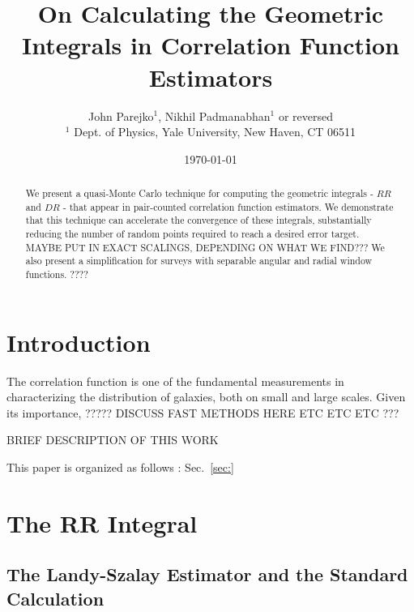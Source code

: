 \documentclass[usenatbib]{mn2e}
\begin{document}
\topmargin-1cm

\newcommand{\bd}{{\bm \delta}}


\title[Geometric Integrals for Correlation Functions]
{On Calculating the Geometric Integrals in Correlation Function Estimators}
\author[Parejko\&Padmanabhan]{John Parejko$^{1}$, Nikhil Padmanabhan$^{1}$ or
reversed \\
$^{1}$ Dept. of Physics, Yale University, New Haven, CT 06511 \\
}

\date{\today}
\maketitle

\begin{abstract}
  We present a quasi-Monte Carlo technique for computing the geometric integrals - $RR$ and $DR$ - that appear
  in pair-counted correlation function estimators. We demonstrate that this technique can accelerate the convergence of
  these integrals, substantially reducing the number of random points required
  to reach a desired error target. MAYBE PUT IN EXACT SCALINGS, DEPENDING ON
  WHAT WE FIND??? We also present a simplification for surveys with separable
  angular and radial window functions. ????
\end{abstract}

\section{Introduction}

The correlation function is one of the fundamental measurements in
characterizing the distribution of galaxies, both on small and large scales.
Given its importance, ????? DISCUSS FAST METHODS HERE ETC ETC ETC ???

BRIEF DESCRIPTION OF THIS WORK

This paper is organized as follows : Sec.~\ref{sec:}


\section{The RR Integral}
\label{sec:RR}

\subsection{The Landy-Szalay Estimator and the Standard Calculation}
\end{document}

